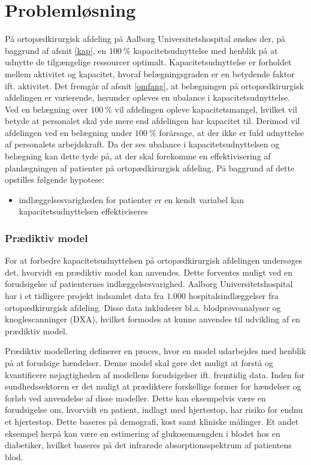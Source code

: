 \chapter{Problemløsning}
På ortopædkirurgisk afdeling på Aalborg Universitetshospital ønskes der, på baggrund af afsnit \ref{kap}, en $100~\%$ kapacitetsudnyttelse med henblik på at udnytte de tilgængelige ressourcer optimalt. Kapacitetsudnyttelse er forholdet mellem aktivitet og kapacitet, hvoraf belægningsgraden er en betydende faktor ift. aktivitet. Det fremgår af afsnit \ref{omfang}, at belægningen på ortopædkirurgisk afdelingen er varierende, herunder opleves en ubalance i kapacitetsudnyttelse. Ved en belægning over $100~\%$ vil afdelingen opleve kapacitetsmangel, hvilket vil betyde at personalet skal yde mere end afdelingen har kapacitet til. Derimod vil afdelingen ved en belægning under $100~\%$ forårsage, at der ikke er fuld udnyttelse af personalets arbejdskraft. Da der ses ubalance i kapacitetsudnyttelsen og belægning kan dette tyde på, at der skal forekomme en effektivisering af planlægningen af patienter på ortopædkirurgisk afdeling. På baggrund af dette opstilles følgende hypotese:\\

\noindent
\begin{itemize}
\item indlæggelsesvarigheden for patienter er en kendt variabel kan kapacitetsudnyttelsen effektiviseres
\end{itemize}

\subsection{Prædiktiv model}
For at forbedre kapacitetsudnyttelsen på ortopædkirurgisk afdelingen undersøges det, hvorvidt en prædiktiv model kan anvendes.
Dette forventes muligt ved en forudsigelse af patienternes indlæggelsesvarighed. Aalborg Universitetshospital har i et tidligere projekt indsamlet data fra $1.000$ hospitalsindlæggelser fra ortopædkirurgisk afdeling. Disse data inkluderer bl.a. blodprøveanalyser og knoglescanninger (DXA), hvilket formodes at kunne anvendes til udvikling af en prædiktiv model. 

\noindent
Prædiktiv modellering definerer en proces, hvor en model udarbejdes med henblik på at forudsige hændelser. Denne model skal gøre det muligt at forstå og kvantificere nøjagtigheden af modellens forudsigelser ift. fremtidig data.\cite{Kuhn2013} 
Inden for sundhedssektoren er det muligt at prædiktere forskellige former for hændelser og forløb ved anvendelse af disse modeller. Dette kan eksempelvis være en forudsigelse om, hvorvidt en patient, indlagt med hjertestop, har risiko for endnu et hjertestop. Dette baseres på demografi, kost samt kliniske målinger. Et andet eksempel herpå kan være en estimering af glukosemængden i blodet hos en diabetiker, hvilket baseres på det infrarøde absorptionsspektrum af patientens blod.\cite{Hastie2008}

